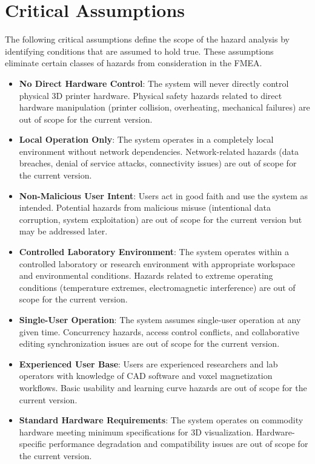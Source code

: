 \documentclass{article}
\begin{document}
\section{Critical Assumptions}

The following critical assumptions define the scope of the hazard analysis by identifying conditions that are assumed to hold true. These assumptions eliminate certain classes of hazards from consideration in the FMEA.

\begin{itemize}
    \item \textbf{No Direct Hardware Control}: The system will never directly control physical 3D printer hardware. Physical safety hazards related to direct hardware manipulation (printer collision, overheating, mechanical failures) are out of scope for the current version.

    \item \textbf{Local Operation Only}: The system operates in a completely local environment without network dependencies. Network-related hazards (data breaches, denial of service attacks, connectivity issues) are out of scope for the current version.

    \item \textbf{Non-Malicious User Intent}: Users act in good faith and use the system as intended. Potential hazards from malicious misuse (intentional data corruption, system exploitation) are out of scope for the current version but may be addressed later.

    \item \textbf{Controlled Laboratory Environment}: The system operates within a controlled laboratory or research environment with appropriate workspace and environmental conditions. Hazards related to extreme operating conditions (temperature extremes, electromagnetic interference) are out of scope for the current version.

    \item \textbf{Single-User Operation}: The system assumes single-user operation at any given time. Concurrency hazards, access control conflicts, and collaborative editing synchronization issues are out of scope for the current version.

    \item \textbf{Experienced User Base}: Users are experienced researchers and lab operators with knowledge of CAD software and voxel magnetization workflows. Basic usability and learning curve hazards are out of scope for the current version.

    \item \textbf{Standard Hardware Requirements}: The system operates on commodity hardware meeting minimum specifications for 3D visualization. Hardware-specific performance degradation and compatibility issues are out of scope for the current version.
\end{itemize}
\end{document}
